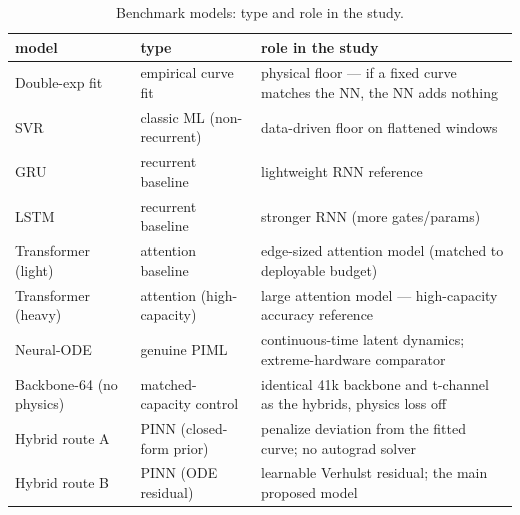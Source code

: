 \begin{table}
\caption{Benchmark models: type and role in the study.}
\label{tab:baseline_comparison_matrix}
\begin{tabular}{lll}
\toprule
model & type & role in the study \\
\midrule
Double-exp fit & empirical curve fit & physical floor --- if a fixed curve matches the NN, the NN adds nothing \\
SVR & classic ML (non-recurrent) & data-driven floor on flattened windows \\
GRU & recurrent baseline & lightweight RNN reference \\
LSTM & recurrent baseline & stronger RNN (more gates/params) \\
Transformer (light) & attention baseline & edge-sized attention model (matched to deployable budget) \\
Transformer (heavy) & attention (high-capacity) & large attention model --- high-capacity accuracy reference \\
Neural-ODE & genuine PIML & continuous-time latent dynamics; extreme-hardware comparator \\
Backbone-64 (no physics) & matched-capacity control & identical 41k backbone and t-channel as the hybrids, physics loss off \\
Hybrid route A & PINN (closed-form prior) & penalize deviation from the fitted curve; no autograd solver \\
Hybrid route B & PINN (ODE residual) & learnable Verhulst residual; the main proposed model \\
\bottomrule
\end{tabular}
\end{table}
